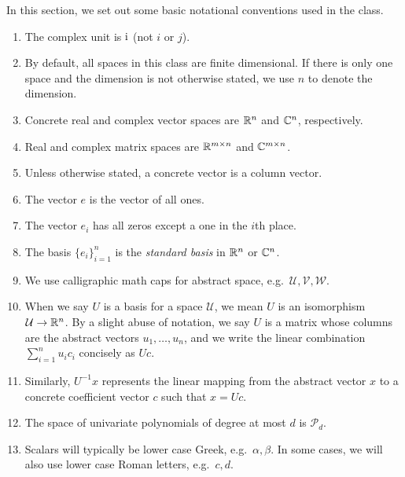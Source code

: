 \documentclass[12pt, leqno]{article}
\begin{document}
In this section, we set out some basic notational conventions used
in the class.
\begin{enumerate}
\item
  The complex unit is $\mathrm{i}$ (not $i$ or $j$).

\item
  By default, all spaces in this class are finite dimensional. If there
  is only one space and the dimension is not otherwise stated, we use
  $n$ to denote the dimension.

\item
  Concrete real and complex vector spaces are $\mathbb{R}^n$ and $\mathbb{C}^n$,
  respectively.

\item
  Real and complex matrix spaces are $\mathbb{R}^{m\times n}$ and $\mathbb{C}^{m
  \times n}$.

\item Unless otherwise stated, a concrete vector is a column vector.

\item The vector $e$ is the vector of all ones.

\item The vector $e_i$ has all zeros except a one in the $i$th place.

\item
  The basis $\{ e_i \}_{i=1}^n$ is the {\em standard basis} in $\mathbb{R}^n$
  or $\mathbb{C}^n$.

\item
  We use calligraphic math caps for abstract space,
  e.g.~$\mathcal{U}, \mathcal{V}, \mathcal{W}$.

\item
   When we say $U$ is a basis for a space $\mathcal{U}$, we mean $U$ is
   an isomorphism $\mathcal{U} \rightarrow \mathbb{R}^n$.  By a slight abuse
   of notation, we say $U$ is a matrix whose columns are the abstract
   vectors $u_1, \ldots, u_n$, and we write the linear combination
   $\sum_{i=1}^n u_i c_i$ concisely as $Uc$.

\item
  Similarly, $U^{-1} x$ represents the linear mapping from the
  abstract vector $x$ to a concrete coefficient vector $c$ such
  that $x = Uc$.

\item The space of univariate polynomials of degree at most
  $d$ is $\mathcal{P}_d$.

\item
  Scalars will typically be lower case Greek, e.g.~$\alpha, \beta$. In
  some cases, we will also use lower case Roman letters, e.g.~$c, d$.


\end{enumerate}
\end{document}
